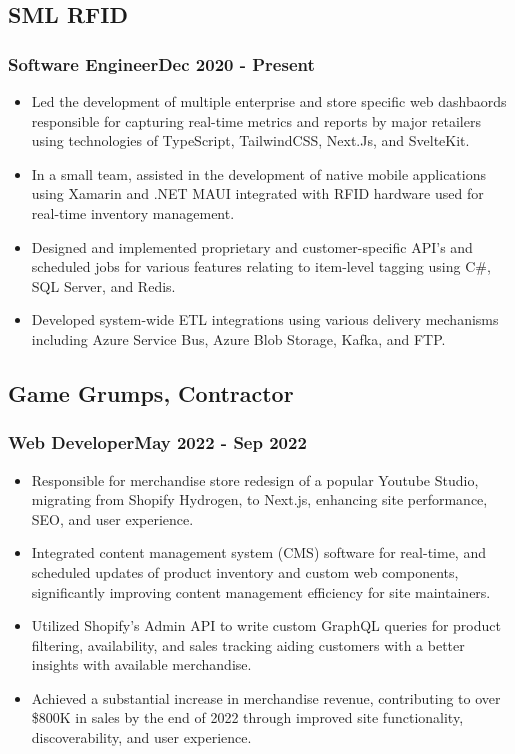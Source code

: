 \newcommand\position[4]{
	\subsection*{#1}
	\subsubsection*{\normalfont#2\hfill\normalfont#3}
	#4
	\vspace{-0.25cm}
}


\position{SML RFID}{Software Engineer}{Dec 2020 - Present}{
	\begin{itemize}
		\item Led the development of multiple enterprise and store specific web dashbaords responsible for capturing real-time metrics and reports by major retailers using technologies of TypeScript, TailwindCSS, Next.Js, and SvelteKit.
		\item In a small team, assisted in the development of native mobile applications using Xamarin and .NET MAUI integrated with RFID hardware used for real-time inventory management.
		\item Designed and implemented proprietary and customer-specific API's and scheduled jobs for various features relating to item-level tagging using C\#, SQL Server, and Redis.
		\item Developed system-wide ETL integrations using various delivery mechanisms including Azure Service Bus, Azure Blob Storage, Kafka, and FTP.
	\end{itemize}
}

\position{Game Grumps, Contractor}{Web Developer}{May 2022 - Sep 2022}{
	\begin{itemize}
		\item Responsible for merchandise store redesign of a popular Youtube Studio, migrating from Shopify Hydrogen, to Next.js, enhancing site performance, SEO, and user experience.
		\item Integrated content management system (CMS) software for real-time, and scheduled updates of product inventory and custom web components, significantly improving content management efficiency for site maintainers.
		\item Utilized Shopify's Admin API to write custom GraphQL queries for product filtering, availability, and sales tracking aiding customers with a better insights with available merchandise.
		\item Achieved a substantial increase in merchandise revenue, contributing to over \$800K in sales by the end of 2022 through improved site functionality, discoverability, and user experience.
	\end{itemize}
}

